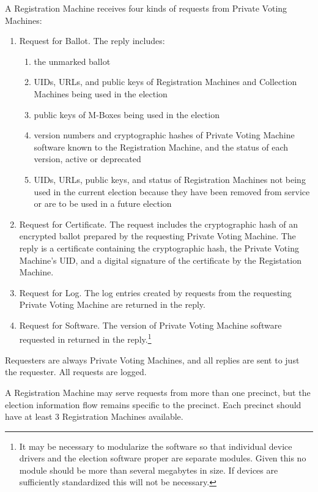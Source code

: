 \documentclass[12pt]{article}
\begin{document}
A Registration Machine receives four kinds of requests from
Private Voting Machines:
\begin{enumerate}

\item
Request for Ballot.  The reply includes:
\begin{enumerate}
\item the unmarked ballot
\item UIDs, URLs, and public keys
      of Registration Machines and Collection Machines being used
      in the election
\item public keys of M-Boxes being used in the election
\item version numbers and cryptographic hashes
      of Private Voting Machine software
      known to the Registration Machine, and
      the status of each version, active or deprecated
\item UIDs, URLs, public keys, and status of Registration Machines not
      being used in the current election because they have been removed
      from service or are to be used in a future election
\end{enumerate}

\item
Request for Certificate.  The request includes the cryptographic hash
of an encrypted ballot prepared by the requesting Private
Voting Machine.  The reply is a certificate containing
the cryptographic hash, the Private Voting Machine's UID,
and a digital signature of the certificate by the Registation Machine.

\item
Request for Log.  The log entries created by requests from the
requesting Private Voting Machine are returned in the reply.

\item
Request for Software.  The version of Private Voting Machine software
requested in returned in the reply.\footnote{It may be necessary to
modularize the software so that individual device drivers and
the election software proper are separate modules.  Given this no module
should be more than several megabytes in size.  If devices are sufficiently
standardized this will not be necessary.}

\end{enumerate}

Requesters are always Private Voting Machines, and all replies
are sent to just the requester.  All requests are logged.

A Registration Machine may serve requests from more than
one precinct, but the election information flow remains specific
to the precinct.  Each precinct should have at least 3
Registration Machines available.
\end{document}
